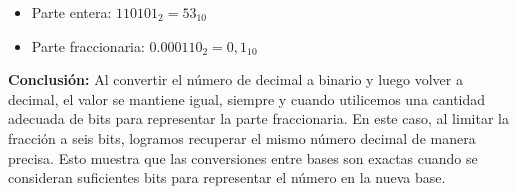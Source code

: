 \documentclass[12pt]{article}
\begin{document}
\begin{itemize}
    \item Parte entera: $110101_2 = 53_{10}$
    \item Parte fraccionaria: $0.000110_2 = 0,1_{10}$
\end{itemize}


\textbf{Conclusión:} Al convertir el número de decimal a binario y luego volver a decimal, el valor se mantiene igual, siempre y cuando utilicemos una cantidad adecuada de bits para representar la parte fraccionaria. En este caso, al limitar la fracción a seis bits, logramos recuperar el mismo número decimal de manera precisa. Esto muestra que las conversiones entre bases son exactas cuando se consideran suficientes bits para representar el número en la nueva base.
\end{document}
